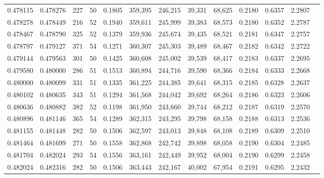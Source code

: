 \begin{tabular}{rrrrrrrrrrrrr}
0.478115 & 0.478276 &    227 &    50 &                                     0.1805 & 359,395 & 246,215 &  39,331 &  68,625 & 0.2180 & 0.6357 & 2.2807 \\
0.478278 & 0.478449 &    216 &    52 &                                     0.1940 & 359,611 & 245,999 &  39,383 &  68,573 & 0.2180 & 0.6352 & 2.2787 \\
0.478467 & 0.478790 &    325 &    52 &                                     0.1379 & 359,936 & 245,674 &  39,435 &  68,521 & 0.2181 & 0.6347 & 2.2757 \\
0.478797 & 0.479127 &    371 &    54 &                                     0.1271 & 360,307 & 245,303 &  39,489 &  68,467 & 0.2182 & 0.6342 & 2.2722 \\
0.479144 & 0.479563 &    301 &    50 &                                     0.1425 & 360,608 & 245,002 &  39,539 &  68,417 & 0.2183 & 0.6337 & 2.2695 \\
0.479580 & 0.480000 &    286 &    51 &                                     0.1513 & 360,894 & 244,716 &  39,590 &  68,366 & 0.2184 & 0.6333 & 2.2668 \\
0.480000 & 0.480099 &    331 &    51 &                                     0.1335 & 361,225 & 244,385 &  39,641 &  68,315 & 0.2185 & 0.6328 & 2.2637 \\
0.480102 & 0.480635 &    343 &    51 &                                     0.1294 & 361,568 & 244,042 &  39,692 &  68,264 & 0.2186 & 0.6323 & 2.2606 \\
0.480636 & 0.480882 &    382 &    52 &                                     0.1198 & 361,950 & 243,660 &  39,744 &  68,212 & 0.2187 & 0.6319 & 2.2570 \\
0.480896 & 0.481146 &    365 &    54 &                                     0.1289 & 362,315 & 243,295 &  39,798 &  68,158 & 0.2188 & 0.6313 & 2.2536 \\
0.481155 & 0.481448 &    282 &    50 &                                     0.1506 & 362,597 & 243,013 &  39,848 &  68,108 & 0.2189 & 0.6309 & 2.2510 \\
0.481464 & 0.481699 &    271 &    50 &                                     0.1558 & 362,868 & 242,742 &  39,898 &  68,058 & 0.2190 & 0.6304 & 2.2485 \\
0.481704 & 0.482024 &    293 &    54 &                                     0.1556 & 363,161 & 242,449 &  39,952 &  68,004 & 0.2190 & 0.6299 & 2.2458 \\
0.482024 & 0.482316 &    282 &    50 &                                     0.1506 & 363,443 & 242,167 &  40,002 &  67,954 & 0.2191 & 0.6295 & 2.2432 \\

\end{tabular}
